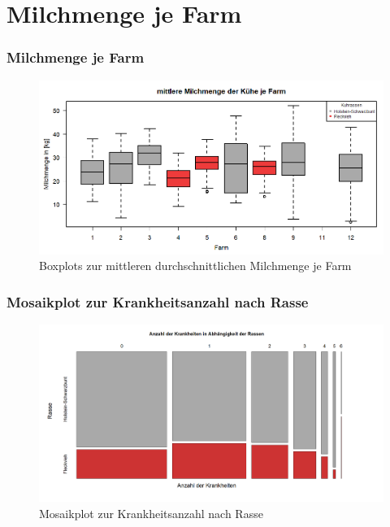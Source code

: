 \documentclass{beamer}
\begin{document}
    	\section{Milchmenge je Farm}
	\begin{frame}
		\frametitle{Milchmenge je Farm}
		\begin{figure}[h]
			\centering
			\includegraphics[width=1\textwidth]{Boxplot Milch~Farm.png}
			\vspace{-0.6cm}
			\caption{Boxplots zur mittleren durchschnittlichen Milchmenge je Farm}
		\end{figure}
	\end{frame}
	\begin{frame}
		\frametitle{Mosaikplot zur Krankheitsanzahl nach Rasse}
		\begin{figure}[h]
			\centering
			\includegraphics[scale=0.35]{Mosaikplots.png}
			\vspace{-0.6cm}
			\caption{Mosaikplot zur Krankheitsanzahl nach Rasse}
		\end{figure}
	\end{frame}
\end{document}
